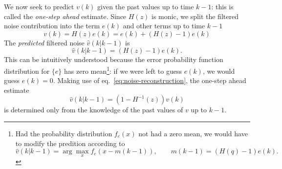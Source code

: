 We now seek to predict $v(k)$ given the past values up to time $k-1$: this is called the \emph{one-step ahead} estimate. Since $H(z)$ is monic, we split the filtered noise contribution into the term $e(k)$ and other terms up to time $k-1$
\begin{equation}
  \label{eq:prediction-split-filtered-noise}
  v(k) = H(z)e(k) = e(k) + \left(H(z)-1\right)e(k)
\end{equation}
The \emph{predicted} filtered noise $\hat{v}(k|k-1)$ is
\begin{equation*}
  \hat{v}(k|k-1) = (H(z)-1)e(k).
\end{equation*}
This can be intuitively understood because the error probability function distribution for $\{e\}$ has zero mean\footnote{Had the probability distribution $f_e(x)$ not had a zero mean, we would have to modify the predition according to
  \begin{equation*}
    \hat{v}(k|k-1) = \arg\max_x f_e(x - m(k-1)),\hspace{2em} m(k-1) = (H(q)-1)e(k).
  \end{equation*}}: if we were left to guess $e(k)$, we would guess $e(k)=0$. Making use of eq.~\eqref{eq:noise-reconstruction}, the one-step ahead estimate
\begin{equation}
  \label{eq:filtered-noise-one-step-prediction}
  \hat{v}(k|k-1) = \left(1-H^{-1}(z)\right)v(k)
\end{equation}
is determined only from the knowledge of the past values of $v$ up to $k-1$.

